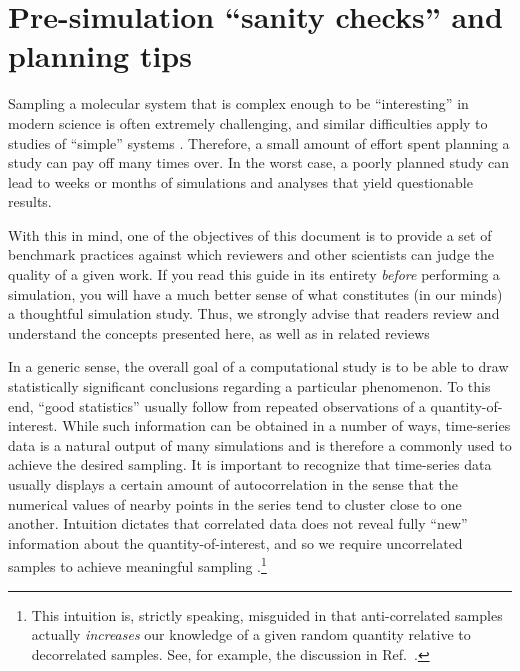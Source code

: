 \section{Pre-simulation ``sanity checks'' and planning tips}
\label{sec:sanity}

Sampling a molecular system that is complex enough to be ``interesting'' in modern science is often extremely challenging, and similar difficulties apply to studies of ``simple'' systems \cite{Schappals2017}.
Therefore, a small amount of effort spent planning a study can pay off many times over.  In the worst case, a poorly planned study can lead to weeks or months of simulations and analyses that yield questionable results.

With this in mind, one of the objectives of this document is to provide a set of benchmark practices against which reviewers and other scientists can judge the quality of a given work.  If you read this guide in its entirety \emph{before} performing a simulation, you will have a much better sense of what constitutes (in our minds) a thoughtful simulation study.  Thus, we strongly advise that readers review and understand the concepts presented here, as well as in related reviews \cite{Grossfield2009,JCGM:GUM2008,PatroneUQreview}


In a generic sense, the overall goal of a computational study is to be able to draw statistically significant conclusions regarding a particular phenomenon.  To this end, ``good statistics'' usually follow from repeated observations of a quantity-of-interest.  While such information can be obtained in a number of ways, time-series data is a natural output of many simulations and is therefore a commonly used to achieve the desired sampling.  
It is important to recognize that time-series data usually displays a certain amount of autocorrelation in the sense that the numerical values of nearby points in the series tend to cluster close to one another.  Intuition dictates that correlated data does not reveal fully ``new'' information about the quantity-of-interest, and so we require uncorrelated samples to achieve meaningful sampling \cite{PatroneAIAA}.\footnote{This intuition is, strictly speaking, misguided in that anti-correlated samples actually {\it increases} our knowledge of a given random quantity relative to decorrelated samples.  See, for example, the discussion in Ref.~\cite{PatroneAIAA}.}

